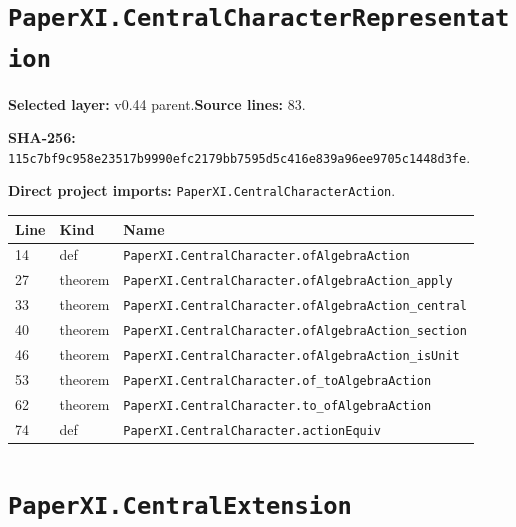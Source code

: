 \documentclass[10pt,oneside]{book}
\begin{document}
\section{\texorpdfstring{\nolinkurl{PaperXI.CentralCharacterRepresentation}}{PaperXI.CentralCharacterRepresentation}}\label{module:PaperXI.CentralCharacterRepresentation}

\textbf{Selected layer:} v0.44 parent.\quad\textbf{Source lines:} 83.\par\textbf{SHA-256:} {\scriptsize\nolinkurl{115c7bf9c958e23517b9990efc2179bb7595d5c416e839a96ee9705c1448d3fe}}.


\textbf{Direct project imports:} \nolinkurl{PaperXI.CentralCharacterAction}.

\begin{longtable}{@{}p{}p{}p{}@{}}\toprule Line&Kind&Name\\\midrule\endhead

14&def&\nolinkurl{PaperXI.CentralCharacter.ofAlgebraAction}\\

27&theorem&\nolinkurl{PaperXI.CentralCharacter.ofAlgebraAction_apply}\\

33&theorem&\nolinkurl{PaperXI.CentralCharacter.ofAlgebraAction_central}\\

40&theorem&\nolinkurl{PaperXI.CentralCharacter.ofAlgebraAction_section}\\

46&theorem&\nolinkurl{PaperXI.CentralCharacter.ofAlgebraAction_isUnit}\\

53&theorem&\nolinkurl{PaperXI.CentralCharacter.of_toAlgebraAction}\\

62&theorem&\nolinkurl{PaperXI.CentralCharacter.to_ofAlgebraAction}\\

74&def&\nolinkurl{PaperXI.CentralCharacter.actionEquiv}\\

\bottomrule\end{longtable}

\section{\texorpdfstring{\nolinkurl{PaperXI.CentralExtension}}{PaperXI.CentralExtension}}\label{module:PaperXI.CentralExtension}
\end{document}
